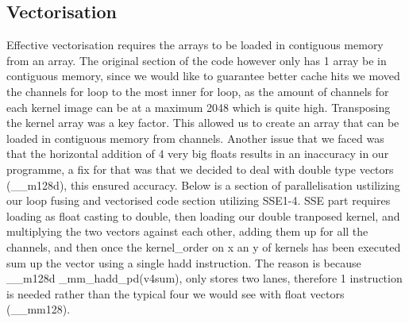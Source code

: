 \documentclass[12pt,fleqn,leqno,letterpaper]{article}
\begin{document}
\subsection{Vectorisation}
Effective vectorisation requires the arrays to be loaded in contiguous memory from an array. The
original section of the code however only has 1 array be in contiguous memory, since we would like to
guarantee better cache hits we moved the channels for loop to the most inner for loop, as the amount of
channels for each kernel image can be at a maximum 2048 which is quite high. 
Transposing the kernel array was a key factor. This allowed us to create an array that can be loaded in contiguous
memory from channels. Another issue that we faced was that the horizontal addition of 4 very big floats results in
an inaccuracy in our programme, a fix for that was that we decided to deal with double type vectors (\_\_m128d), this
ensured accuracy. Below is a section of parallelisation ustilizing our loop fusing and vectorised code section utilizing
SSE1-4. SSE part requires loading as float casting to double, then loading our double tranposed kernel, and multiplying
the two vectors against each other, adding them up for all the channels, and then once the kernel\_order on x an y of kernels
has been executed sum up the vector using a single hadd instruction. The reason is because \_\_m128d \_mm\_hadd\_pd(v4sum), only
stores two lanes, therefore 1 instruction is needed rather than the typical four we would see with float vectors (\_\_mm128).
\newpage
\end{document}
